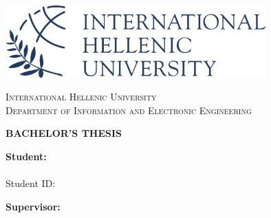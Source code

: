 \begin{titlepage}
\centering
\includegraphics[width=10cm]{images/titlepage/Logo_IHU_EN.png}

\textsc{\huge International Hellenic University}\\
\textsc{\large Department of Information and Electronic Engineering}

\vspace{3cm}

\textbf{\huge BACHELOR'S THESIS}\\
\vspace{0.5cm}
\textbf{\huge \thesisTitle}

\vspace{7cm}

\begin{minipage}[t]{0.45\textwidth}
\raggedright
\textbf{Student:}\\
\studentName\\
Student ID: \studentID
\end{minipage}
\hspace{1cm}
\begin{minipage}[t]{0.45\textwidth}
\raggedleft
\textbf{Supervisor:}\\
\supervisorName\\
\end{minipage}

\vfill
{\completionDatePretty}
\end{titlepage}
